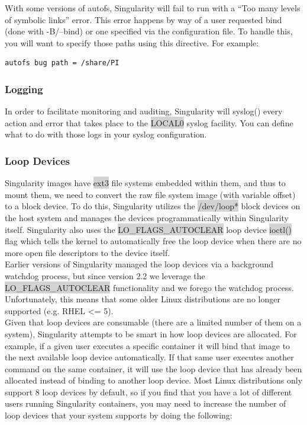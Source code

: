 \documentclass[a4paper]{article}
\newcounter{subsubsubsection}[subsubsection]
\begin{document}

With some versions of autofs, Singularity will fail to run with a “Too many levels of symbolic links” error. This error happens by way of a user requested bind (done with -B/–bind) or one specified via the configuration file. To handle this, you will want to specify those paths using this directive. For example:\\[0.1in]
\begin{lstlisting}[frame=single]
autofs bug path = /share/PI
\end{lstlisting}


\subsubsection{Logging}

In order to facilitate monitoring and auditing, Singularity will syslog() every action and error that takes place to the \colorbox{lightgray}{LOCAL0} syslog facility. You can define what to do with those logs in your syslog configuration.



\subsubsection{Loop Devices}

Singularity images have  \colorbox{lightgray}{ext3} file systems embedded within them, and thus to mount them, we need to convert the raw file system image (with variable offset) to a block device. To do this, Singularity utilizes the  \colorbox{lightgray}{/dev/loop*} block devices on the host system and manages the devices programmatically within Singularity itself. Singularity also uses the  \colorbox{lightgray}{LO\_FLAGS\_AUTOCLEAR} loop device  \colorbox{lightgray}{ioctl()} flag which tells the kernel to automatically free the loop device when there are no more open file descriptors to the device itself.\\[0.1in]

Earlier versions of Singularity managed the loop devices via a background watchdog process, but since version 2.2 we leverage the  \colorbox{lightgray}{LO\_FLAGS\_AUTOCLEAR} functionality and we forego the watchdog process. Unfortunately, this means that some older Linux distributions are no longer supported (e.g. RHEL <= 5).\\[0.1in]

Given that loop devices are consumable (there are a limited number of them on a system), Singularity attempts to be smart in how loop devices are allocated. For example, if a given user executes a specific container it will bind that image to the next available loop device automatically. If that same user executes another command on the same container, it will use the loop device that has already been allocated instead of binding to another loop device. Most Linux distributions only support 8 loop devices by default, so if you find that you have a lot of different users running Singularity containers, you may need to increase the number of loop devices that your system supports by doing the following:\\[0.1in]
\end{document}
